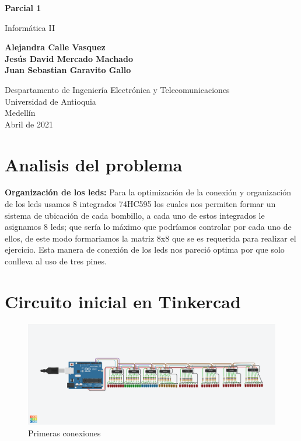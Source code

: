 \documentclass{article}
\begin{document}
\begin{titlepage}
    \begin{center}
        \vspace*{1cm}
            
        \Huge
        \textbf{Parcial 1}
            
        \vspace{0.5cm}
        \LARGE
        Informática II
            
        \vspace{2.5cm}
            
        \textbf{Alejandra Calle Vasquez\\
                Jesús David Mercado Machado \\
                Juan Sebastian Garavito Gallo}
            
        \vfill
            
        \vspace{0.7cm}
            
        \Large
        Despartamento de Ingeniería Electrónica y Telecomunicaciones\\
        Universidad de Antioquia\\
        Medellín\\
        Abril de 2021
            
    \end{center}
\end{titlepage}

\tableofcontents
\newpage
\section{Analisis del problema}\label{intro}
\textbf{Organización de los leds: }
Para la optimización de la conexión y organización de los leds usamos 8 integrados 74HC595 los cuales nos permiten formar un sistema de ubicación de cada bombillo, a cada uno de estos integrados le asignamos 8 leds; que sería lo máximo que podríamos controlar por cada uno de ellos, de este modo formariamos la matriz 8x8 que se es requerida para realizar el ejercicio. Esta manera de conexión de los leds nos pareció optima por que solo conlleva al uso de tres pines.

\section{Circuito inicial en Tinkercad} \label{imagenes}

\begin{figure}[h]
\includegraphics[width=15cm]{PARCIAL INFO 2.png}
\centering
\caption{Primeras conexiones}
\label{fig:PARCIAL INFO 2}
\end{figure}
\newpage
\end{document}
